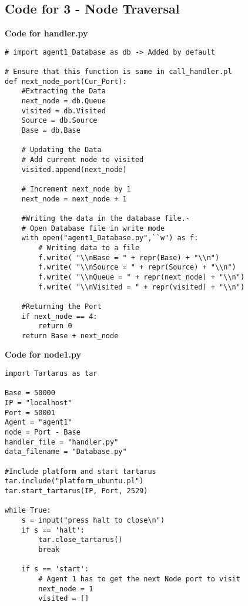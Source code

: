 \documentclass[12t]{csethesis}
\begin{document}
\begin{appendices}
\chapter{Code for 3 - Node Traversal} \label{traverse}
\textbf{Code for handler.py}
\begin{lstlisting}
# import agent1_Database as db -> Added by default

# Ensure that this function is same in call_handler.pl
def next_node_port(Cur_Port):
    #Extracting the Data
    next_node = db.Queue
    visited = db.Visited
    Source = db.Source
    Base = db.Base
    
    # Updating the Data
    # Add current node to visited
    visited.append(next_node)

    # Increment next_node by 1
    next_node = next_node + 1
    
    #Writing the data in the database file.-
    # Open Database file in write mode
    with open("agent1_Database.py",``w") as f:
        # Writing data to a file 
        f.write( "\\nBase = " + repr(Base) + "\\n")
        f.write( "\\nSource = " + repr(Source) + "\\n")
        f.write( "\\nQueue = " + repr(next_node) + "\\n")
        f.write( "\\nVisited = " + repr(visited) + "\\n")

    #Returning the Port
    if next_node == 4:
        return 0
    return Base + next_node

\end{lstlisting}
\clearpage
\textbf{Code for node1.py}
\begin{lstlisting}
import Tartarus as tar

Base = 50000
IP = "localhost"
Port = 50001
Agent = "agent1"
node = Port - Base
handler_file = "handler.py"
data_filename = "Database.py"

#Include platform and start tartarus
tar.include("platform_ubuntu.pl")
tar.start_tartarus(IP, Port, 2529)

while True:
    s = input("press halt to close\n")
    if s == 'halt':
        tar.close_tartarus()
        break

    if s == 'start':
        # Agent 1 has to get the next Node port to visit
        next_node = 1
        visited = []


\end{lstlisting}
\end{appendices}
\end{document}
